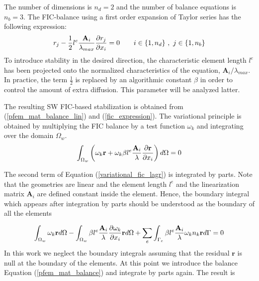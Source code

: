 The number of dimensions is $n_d=2$ and the number of balance equations is $n_b=3$. The FIC-balance using a first order expansion of Taylor series has the following expression:
\begin{equation} \label{fic_expression}
    r_j - \frac{1}{2} l^e \frac{\mathbf{A}_i}{\lambda_{max}} \frac{\partial r_j}{\partial x_i} = 0 \qquad i \in \{1,n_d\} \ , \ j \in \{1,n_b\}
\end{equation}
To introduce stability in the desired direction, the characteristic element length $l^e$ has been projected onto the normalized characteristics of the equation, $\mathbf{A}_i/\lambda_{max}$.
In practice, the term $\frac{1}{2}$ is replaced by an algorithmic constant $\beta$ in order to control the amount of extra diffusion. This parameter will be analyzed latter.


The resulting SW FIC-based stabilization is obtained from (\ref{pfem_mat_balance_lin}) and (\ref{fic_expression}). The variational principle is obtained by multiplying the FIC balance by a test function $\omega_k$ and integrating over the domain $\Omega_w$.
\begin{equation} \label{variational_fic_lagr}
    \int_{\Omega_w} \left(\omega_k \mathbf{r} + \omega_k \beta l^e \frac{\mathbf{A}_i}{\lambda} \frac{\partial\mathbf{r}}{\partial x_i}\right) d\Omega = 0
\end{equation}


The second term of Equation (\ref{variational_fic_lagr}) is integrated by parts. %
Note that the geometries are linear and the element length $l^e$ and the linearization matrix $\mathbf{A}_i$ are defined constant inside the element. Hence, the boundary integral which appears after integration by parts should be understood as the boundary of all the elements

\begin{equation} \label{variational_fic_lagr_parts}
\int_{\Omega_w} \omega_k \mathbf{r} d\Omega
- \int_{\Omega_w} \beta l^e\frac{\mathbf{A}_i}{\lambda}\frac{\partial\omega_k}{\partial x_i} \mathbf{r} d\Omega
+ \sum_e \int_{\Gamma_e} \beta l^e\frac{\mathbf{A}_i}{\lambda}\omega_kn_k \mathbf{r} d\Gamma = 0
\end{equation}
In this work we neglect the boundary integrals assuming that the residual $\mathbf{r}$ is null at the boundary of the elements. At this point we introduce the balance Equation (\ref{pfem_mat_balance}) and integrate by parts again. The result is

